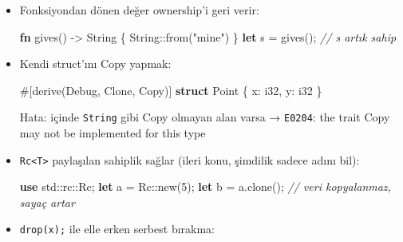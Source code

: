 \documentclass[12pt,a4paper]{article}
\newenvironment{Shaded}{}{}
\newcommand{\CommentTok}[1]{\textcolor[rgb]{0.38,0.63,0.69}{\textit{#1}}}
\newcommand{\DataTypeTok}[1]{\textcolor[rgb]{0.56,0.13,0.00}{#1}}
\newcommand{\DecValTok}[1]{\textcolor[rgb]{0.25,0.63,0.44}{#1}}
\newcommand{\FunctionTok}[1]{\textcolor[rgb]{0.02,0.16,0.49}{#1}}
\newcommand{\KeywordTok}[1]{\textcolor[rgb]{0.00,0.44,0.13}{\textbf{#1}}}
\newcommand{\NormalTok}[1]{#1}
\newcommand{\OperatorTok}[1]{\textcolor[rgb]{0.40,0.40,0.40}{#1}}
\newcommand{\StringTok}[1]{\textcolor[rgb]{0.25,0.44,0.63}{#1}}
\begin{document}
\begin{itemize}
\begin{Shaded}
\begin{Highlighting}[]
\KeywordTok{fn} \FunctionTok{takes}\OperatorTok{(}\NormalTok{s}\OperatorTok{:} \DataTypeTok{String}\OperatorTok{)} \OperatorTok{\{\}}
\KeywordTok{let}\NormalTok{ s }\OperatorTok{=} \DataTypeTok{String}\OperatorTok{::}\FunctionTok{from}\OperatorTok{(}\StringTok{"x"}\OperatorTok{);}
\FunctionTok{takes}\OperatorTok{(}\NormalTok{s}\OperatorTok{);}
\NormalTok{println}\OperatorTok{!(}\StringTok{"\{s\}"}\OperatorTok{);}   \CommentTok{// E0382}
\end{Highlighting}
\end{Shaded}


  İlgili: \texttt{\&s} ile borrow et (Konu 12), taşıma olmaz
\item
  Fonksiyondan dönen değer ownership'i geri verir:

\begin{Shaded}
\begin{Highlighting}[]
\KeywordTok{fn} \FunctionTok{gives}\OperatorTok{()} \OperatorTok{-\textgreater{}} \DataTypeTok{String} \OperatorTok{\{} \DataTypeTok{String}\OperatorTok{::}\FunctionTok{from}\OperatorTok{(}\StringTok{"mine"}\OperatorTok{)} \OperatorTok{\}}
\KeywordTok{let}\NormalTok{ s }\OperatorTok{=} \FunctionTok{gives}\OperatorTok{();}   \CommentTok{// s artık sahip}
\end{Highlighting}
\end{Shaded}
\item
  Kendi struct'ını Copy yapmak:

\begin{Shaded}
\begin{Highlighting}[]
\NormalTok{\#}\OperatorTok{[}\FunctionTok{derive}\OperatorTok{(}\NormalTok{Debug}\OperatorTok{,}\NormalTok{ Clone}\OperatorTok{,}\NormalTok{ Copy}\OperatorTok{)]}
\KeywordTok{struct}\NormalTok{ Point }\OperatorTok{\{}\NormalTok{ x}\OperatorTok{:} \DataTypeTok{i32}\OperatorTok{,}\NormalTok{ y}\OperatorTok{:} \DataTypeTok{i32} \OperatorTok{\}}
\end{Highlighting}
\end{Shaded}


  Hata: içinde \texttt{String} gibi Copy olmayan alan varsa → \texttt{E0204}: the trait Copy may not be implemented for this type
\item
  \texttt{Rc\textless{}T\textgreater{}} paylaşılan sahiplik sağlar (ileri konu, şimdilik sadece adını bil):

\begin{Shaded}
\begin{Highlighting}[]
\KeywordTok{use}\NormalTok{ std}\OperatorTok{::}\NormalTok{rc}\OperatorTok{::}\DataTypeTok{Rc}\OperatorTok{;}
\KeywordTok{let}\NormalTok{ a }\OperatorTok{=} \DataTypeTok{Rc}\OperatorTok{::}\FunctionTok{new}\OperatorTok{(}\DecValTok{5}\OperatorTok{);}
\KeywordTok{let}\NormalTok{ b }\OperatorTok{=}\NormalTok{ a}\OperatorTok{.}\FunctionTok{clone}\OperatorTok{();}   \CommentTok{// veri kopyalanmaz, sayaç artar}
\end{Highlighting}
\end{Shaded}
\item
  \texttt{drop(x);} ile elle erken serbest bırakma:


\end{itemize}
\end{document}
